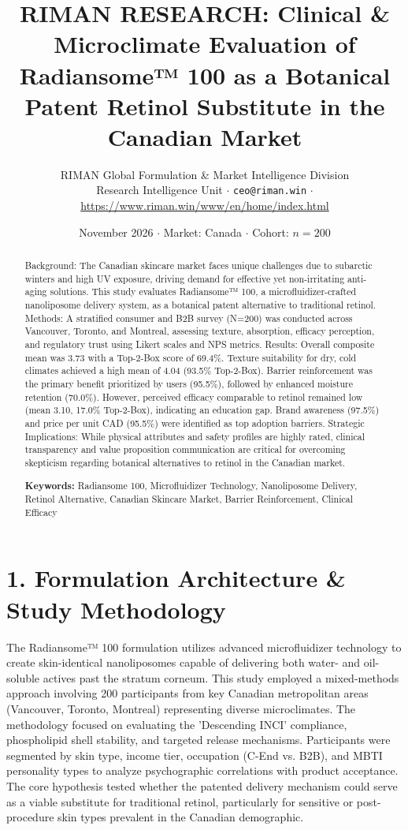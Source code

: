 \documentclass[10pt,twocolumn,a4paper]{article}
\title{\textbf{RIMAN RESEARCH: Clinical \& Microclimate Evaluation of Radiansome™ 100 as a Botanical Patent Retinol Substitute in the Canadian Market}}
\author{RIMAN Global Formulation \& Market Intelligence Division\\
\small Research Intelligence Unit $\cdot$ \texttt{ceo@riman.win} $\cdot$ \url{https://www.riman.win/www/en/home/index.html}}
\date{November 2026 \quad $\cdot$ \quad Market: Canada \quad $\cdot$ \quad Cohort: $n = 200$}
\begin{document}
\maketitle

\begin{abstract}
Background: The Canadian skincare market faces unique challenges due to subarctic winters and high UV exposure, driving demand for effective yet non-irritating anti-aging solutions. This study evaluates Radiansome™ 100, a microfluidizer-crafted nanoliposome delivery system, as a botanical patent alternative to traditional retinol. Methods: A stratified consumer and B2B survey (N=200) was conducted across Vancouver, Toronto, and Montreal, assessing texture, absorption, efficacy perception, and regulatory trust using Likert scales and NPS metrics. Results: Overall composite mean was 3.73 with a Top-2-Box score of 69.4\%. Texture suitability for dry, cold climates achieved a high mean of 4.04 (93.5\% Top-2-Box). Barrier reinforcement was the primary benefit prioritized by users (95.5\%), followed by enhanced moisture retention (70.0\%). However, perceived efficacy comparable to retinol remained low (mean 3.10, 17.0\% Top-2-Box), indicating an education gap. Brand awareness (97.5\%) and price per unit CAD (95.5\%) were identified as top adoption barriers. Strategic Implications: While physical attributes and safety profiles are highly rated, clinical transparency and value proposition communication are critical for overcoming skepticism regarding botanical alternatives to retinol in the Canadian market.

\vspace{0.4em}
\noindent\textbf{Keywords:} Radiansome 100, Microfluidizer Technology, Nanoliposome Delivery, Retinol Alternative, Canadian Skincare Market, Barrier Reinforcement, Clinical Efficacy
\end{abstract}

\section{1. Formulation Architecture \& Study Methodology}
The Radiansome™ 100 formulation utilizes advanced microfluidizer technology to create skin-identical nanoliposomes capable of delivering both water- and oil-soluble actives past the stratum corneum. This study employed a mixed-methods approach involving 200 participants from key Canadian metropolitan areas (Vancouver, Toronto, Montreal) representing diverse microclimates. The methodology focused on evaluating the 'Descending INCI' compliance, phospholipid shell stability, and targeted release mechanisms. Participants were segmented by skin type, income tier, occupation (C-End vs. B2B), and MBTI personality types to analyze psychographic correlations with product acceptance. The core hypothesis tested whether the patented delivery mechanism could serve as a viable substitute for traditional retinol, particularly for sensitive or post-procedure skin types prevalent in the Canadian demographic.
\end{document}

